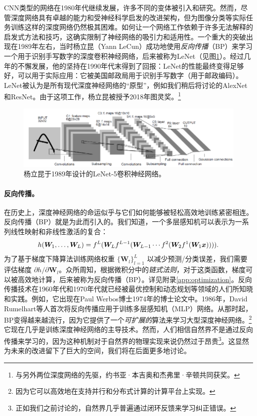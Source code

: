 \documentclass[../../book-main.tex]{subfiles}
\begin{document}
CNN类型的网络在1980年代继续发展，许多不同的变体被引入和研究。然而，尽管深度网络具有卓越的能力和受神经科学启发的改进架构，但为图像分类等实际任务训练这样的深度网络仍然极其困难。如何让一个网络工作依赖于许多无法解释的启发式方法和技巧，这确实限制了神经网络的吸引力和适用性。一个重大的突破出现在1989年左右，当时杨立昆（Yann LeCun）成功地使用{\em 反向传播}（BP）来学习一个用于识别手写数字的深度卷积神经网络\cite{LeCun-1989}，后来被称为LeNet（见图\ref{fig:LeNet-5}）。经过几年的不懈发展，他的坚持在1990年代末得到了回报：LeNet的性能最终变得足够好，可以用于实际应用\cite{LeCun-1998}：它被美国邮政局用于识别手写数字（用于邮政编码）。LeNet被认为是所有现代深度神经网络的“原型”，例如我们稍后将讨论的AlexNet和ResNet。由于这项工作，杨立昆被授予2018年图灵奖。\footnote{与另外两位深度网络的先驱，约书亚·本吉奥和杰弗里·辛顿共同获奖。}

\begin{figure}
    \centering
\includegraphics[width=0.95\linewidth]{figures/LeNet-5.png}
    \caption{杨立昆于1989年设计的LeNet-5卷积神经网络。}
    \label{fig:LeNet-5}
\end{figure}

\paragraph{反向传播。}
在历史上，深度神经网络的命运似乎与它们如何能够被轻松高效地训练紧密相连。反向传播（BP）就是为此而引入的。我们知道，一个多层感知机可以表示为一系列线性映射和非线性激活的复合：
\begin{equation}
h(\bm W_1, \ldots, \bm W_L) = f^L(\bm W_Lf^{L-1}(\bm W_{L-1} \cdots f^2(\bm W_2f^1(\bm W_1\bm{x})))).
\end{equation}
为了基于梯度下降算法训练网络权重 $\{\bm W_l\}_{l=1}^L$ 以减少预测/分类误差，我们需要评估梯度 ${\partial h}/{\partial \bm W_l}$。众所周知，根据微积分中的{\em 链式法则}，对于这类函数，梯度可以被高效地计算，后来被称为反向传播（BP）。详见附录\ref{app:optimization}。反向传播技术在1960年代和1970年代就已经被最优控制和动态规划等领域的人们所知晓和实践。例如，它出现在Paul Werbos博士1974年的博士论文中\cite{Werbos-1974, Werbos1994TheRO}。1986年，David Rumelhart等人首次将反向传播应用于训练多层感知机（MLP）网络\cite{Rumelhart1986}。从那时起，BP变得越来越流行，因为它提供了一个{\em 可扩展的}算法来学习大型深度神经网络。\footnote{因为它可以高效地在支持并行和分布式计算的计算平台上实现。} 它现在几乎是训练深度神经网络的主导技术。然而，人们相信自然界不是通过反向传播来学习的，因为这种机制对于自然界的物理实现来说仍然过于昂贵\footnote{正如我们之前讨论的，自然界几乎普遍通过闭环反馈来学习纠正错误。}。这显然为未来的改进留下了巨大的空间，我们将在后面更多地讨论。
\end{document}
